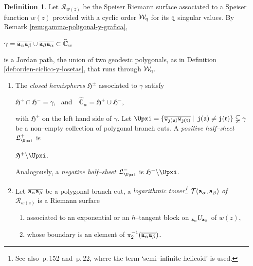 \documentclass[final,3p,times]{elsarticle}
\newcommand{\CW}{\ensuremath{{\widehat{\mathbb C}}}}
\newcommand{\R}{\ensuremath{{\mathcal R}}}
\newcommand{\dominio}[3]{{}_{#2}{#1}_{#3}}
\newcommand{\msigma}{\ensuremath{{\mathfrak{a}}}}
\newcommand{\mrho}{\ensuremath{{\mathfrak{r}}}}
\theoremstyle{definition}
\newtheorem{definition}[theorem]{Definition}
\begin{document}
\begin{definition}
\label{def:logarithmic-tower-for-Riemann-surface}
Let $\R_{w(z)}$ be the Speiser Riemann surface associated to a Speiser function $w(z)$
provided with a cyclic order $\mathcal{W}_{\tt q}$ for its $\tt q$ singular values.
By Remark \ref{rem:gamma-poligonal-y-grafica},

\centerline{$\gamma= 
\overline{{\tt a}_{\alpha} {\tt a}_{\beta}} \cup
\overline{{\tt a}_{\beta} {\tt a}_{\alpha}}
\subset \CW_w
$ }

\noindent 
is a Jordan path,
 the union of two geodesic polygonals, 
as in Definition \ref{def:orden-ciclico-y-losetas}, 
that runs through $\mathcal{W}_{\tt q}$. 

\begin{enumerate}[label=\arabic*),leftmargin=*] 

\item The
\emph{closed hemispheres $\mathfrak{H}^\pm$} 
associated to $\gamma$ satisfy 

\centerline{$
\mathfrak{H}^+ \cap \mathfrak{H}^- = \gamma$, \ and\ \ 
$\CW_w = \mathfrak{H}^+ \cup \mathfrak{H}^-$,
}

\noindent
with $ \mathfrak{H}^+ $  on the left hand side of $\gamma$.
Let $\Upxi=\{
\overline{ {\tt w}_{{\tt j}( \msigma )} 
{\tt w}_{{\tt j}( \mrho )} } 
\ \vert \
{\tt j}( \msigma ) \neq {\tt j}( \mrho )
\} 
\subsetneqq \gamma$
be a non--empty collection of polygonal branch cuts.
A \emph{positive half--sheet $\mathfrak{L}^+_\Upxi$} is 

\centerline{$\mathfrak{H}^+ \backslash \Upxi$.}

\noindent
Analogously, a \emph{negative half--sheet $\mathfrak{L}^-_\Upxi$} is 
$\mathfrak{H}^- \backslash \Upxi$. 



\item
Let $\overline{{\tt a}_{\alpha} {\tt a}_{\beta}}$
be a polygonal branch cut,
a \emph{logarithmic tower\footnote{
See also 
\cite{AlvarezMucino1}\,p.\,152 and
\cite{AlvarezMucino3}\,p.\,22, where the term `semi--infinite helicoid' is used. }
$\mathcal{T}( {\tt a}_{\alpha}, {\tt a}_{\beta} )$
of $\R_{w(z)}$ }
is a Riemann surface 
\begin{enumerate}[label=\roman*),leftmargin=*] 

\item
associated to an exponential or an $h$--tangent block on 
$\dominio{U}{{\tt a}_\alpha}{{\tt a}_\beta} $ of $w(z)$,

\item 
whose boundary is an element of 
$\pi_2^{-1} (\overline{{\tt a}_{\alpha} {\tt a}_{\beta}}) $.
\end{enumerate}


\end{enumerate}
\end{definition}
\end{document}
